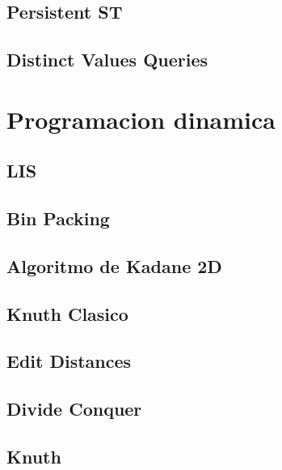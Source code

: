 \subsection{Persistent ST}
\raggedbottom
\hrulefill
\subsection{Distinct Values Queries}
\raggedbottom
\hrulefill

\section{Programacion dinamica}
\subsection{LIS}
\raggedbottom
\hrulefill
\subsection{Bin Packing}
\raggedbottom
\hrulefill
\subsection{Algoritmo de Kadane 2D}
\raggedbottom
\hrulefill
\subsection{Knuth Clasico}
\raggedbottom
\hrulefill
\subsection{Edit Distances}
\raggedbottom
\hrulefill
\subsection{Divide Conquer}
\raggedbottom
\hrulefill
\subsection{Knuth}
\raggedbottom
\hrulefill


